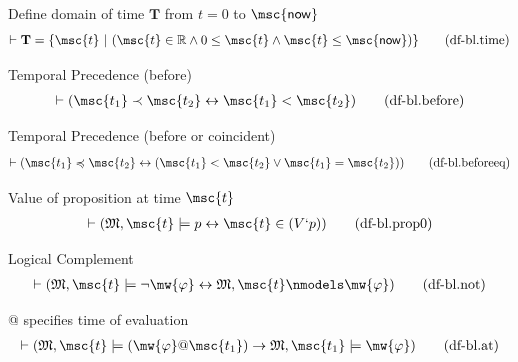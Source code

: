 \begin{metadefinition} {Define domain of time $\mathbf{T}$}
from $t = 0$ to $\mathsf{\msc{now}}$
\begin{align}
\vdash \mathbf{T} = \{ \msc{t}~\vert~( \msc{t} \in \mathbb{R} \wedge 0 \le \msc{t}
    \wedge \msc{t} \le \mathsf{\msc{now}} )
    \}\label{eq:df-bl.time}\tag{df-bl.time}
\end{align}
\end{metadefinition}


\begin{metadefinition} {Temporal Precedence (before)}
\begin{align}
\vdash ( \msc{t_1} \prec \msc{t_2} \leftrightarrow \msc{t_1} < \msc{t_2}
    )\label{eq:df-bl.before}\tag{df-bl.before}
\end{align}
\end{metadefinition}


\begin{metadefinition} {Temporal Precedence (before or
coincident)}
\begin{align}
\vdash ( \msc{t_1} \preccurlyeq \msc{t_2} \leftrightarrow ( \msc{t_1} <
    \msc{t_2} \vee \msc{t_1} = \msc{t_2} )
    )\label{eq:df-bl.beforeeq}\tag{df-bl.beforeeq}
\end{align}
\end{metadefinition}


\begin{metadefinition} {Value of proposition at time
$\msc{t}$}
\begin{align}
\vdash ( \mathfrak{M} , \msc{t} \models p \leftrightarrow \msc{t} \in ( V ` p )
    )\label{eq:df-bl.prop0}\tag{df-bl.prop0}
\end{align}
\end{metadefinition}


\begin{metadefinition} {Logical Complement}
\begin{align}
\vdash ( \mathfrak{M} , \msc{t} \models \lnot \mw{\varphi} \leftrightarrow
    \mathfrak{M} , \msc{t} \nmodels \mw{\varphi}
    )\label{eq:df-bl.not}\tag{df-bl.not}
\end{align}
\end{metadefinition}


\begin{metadefinition} {@ specifies time of evaluation}
\begin{align}
\vdash ( \mathfrak{M} , \msc{t} \models ( \mw{\varphi} @ \msc{t_1} )
    \rightarrow \mathfrak{M} , \msc{t_1} \models \mw{\varphi}
    )\label{eq:df-bl.at}\tag{df-bl.at}
\end{align}
\end{metadefinition}


